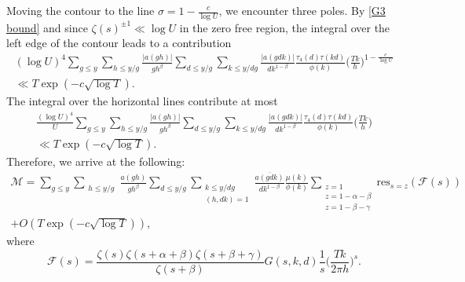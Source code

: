 \documentclass[oneside, 12pt]{amsart}
\theoremstyle{definition}
\newcommand{\mc}{\mathcal}
\newcommand{\ol}{\overline}
\begin{document}
Moving the contour to the line $\sigma=1-\frac{c}{\log U}$, we encounter three poles. By \eqref{G3 bound} and since $\zeta(s)^{\pm 1}\ll \log U$ in the zero free region, the integral over the left edge of the contour leads to a contribution
\begin{multline*}
(\log U)^4\sum_{g\leq y}\sum_{h\leq y/g}\frac{|a(gh)|}{gh^\beta}\sum_{d\leq y/g}\sum_{k\leq y/dg}\frac{|a(gdk)|}{dk^{1-\beta}} \frac{\tau_4(d)\tau(kd)}{\phi(k)} \Big(\frac{Tk}{h}\Big)^{1-\frac{c}{\log U}}
\\
\ll 
T\exp (-c\sqrt{\log T}).
\end{multline*}
The integral over the horizontal lines contribute at most 
\begin{multline*}
\frac{(\log U)^4}{U}\sum_{g\leq y}\sum_{h\leq y/g}\frac{|a(gh)|}{gh^\beta}\sum_{d\leq y/g}\sum_{k\leq y/dg}\frac{|a(gdk)|}{dk^{1-\beta}}\frac{\tau_4(d)\tau(kd)}{\phi(k)}\Big(\frac{Tk}{h}\Big)
\\
\ll T \exp (-c\sqrt{\log T}).
\end{multline*}
 Therefore, we arrive at the following:
\begin{multline}
\label{res comp}
        \mc{M}  =  \sum_{g\leq y} 
               \sum_{\substack{h\leq y/g}} \frac{a(gh)}{gh^\beta }
               \sum_{d\leq y/g}
               \sum_{\substack{k\leq y/dg\\ (h,dk)=1}}\frac{\ol{a(gdk)}}{dk^{1-\beta}}\frac{\mu(k)}{\phi(k)}
               \sum_{\substack{z=1\\z=1-\alpha-\beta\\z=1-\beta-\gamma}}\text{res}_{s=z}(\mc{F}(s))
\\               +O(T\exp(-c\sqrt{\log T})),
\end{multline}  
where
\[
\mc{F}(s)=\frac{\zeta(s)\zeta(s+\alpha+\beta)\zeta(s+\beta+\gamma)}{\zeta(s+\beta)}G(s,k,d)
         \frac{1}{s} \bigg(\frac{Tk}{2\pi h}\bigg)^s.
\]





\end{document}
